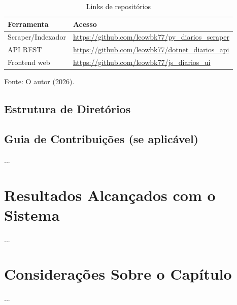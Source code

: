 \begin{table}[h]
    \centering
    \caption{Links de repositórios}
    \label{tab:tabela_links_repos}
    \begin{tabularx}{\textwidth}{l l}
        \toprule
        Ferramenta & Acesso \\
        \midrule
        Scraper/Indexador & \href{https://github.com/leowbk77/py_diarios_scraper}{https://github.com/leowbk77/py\_diarios\_scraper} \\
        API REST & \href{https://github.com/leowbk77/dotnet_diarios_api}{https://github.com/leowbk77/dotnet\_diarios\_api}\\
        Frontend web &
        \href{https://github.com/leowbk77/js_diarios_ui}{https://github.com/leowbk77/js\_diarios\_ui}\\
        \bottomrule
    \end{tabularx}
\end{table}{\footnotesize Fonte: O autor (2026).}

\subsection{Estrutura de Diretórios}


\subsection{Guia de Contribuições (se aplicável)}
...


\section{Resultados Alcançados com o Sistema}
...

\section{Considerações Sobre o Capítulo}
...
